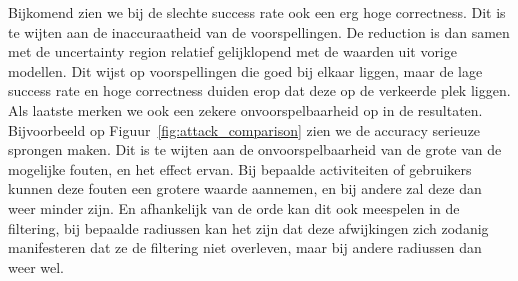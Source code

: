 Bijkomend zien we bij de slechte success rate ook een erg hoge correctness. Dit
is te wijten aan de inaccuraatheid van de voorspellingen. De reduction is dan
samen met de uncertainty region relatief gelijklopend met de waarden uit vorige
modellen. Dit wijst op voorspellingen die goed bij elkaar liggen, maar de lage
success rate en hoge correctness duiden erop dat deze op de verkeerde plek
liggen. Als laatste merken we ook een zekere onvoorspelbaarheid op in de
resultaten. Bijvoorbeeld op Figuur~\ref{fig:attack_comparison} zien we de
accuracy serieuze sprongen maken. Dit is te wijten aan de onvoorspelbaarheid
van de grote van de mogelijke fouten, en het effect ervan. Bij bepaalde
activiteiten of gebruikers kunnen deze fouten een grotere waarde aannemen, en
bij andere zal deze dan weer minder zijn. En afhankelijk van de orde kan dit
ook meespelen in de filtering, bij bepaalde radiussen kan het zijn dat deze
afwijkingen zich zodanig manifesteren dat ze de filtering niet overleven, maar
bij andere radiussen dan weer wel.
